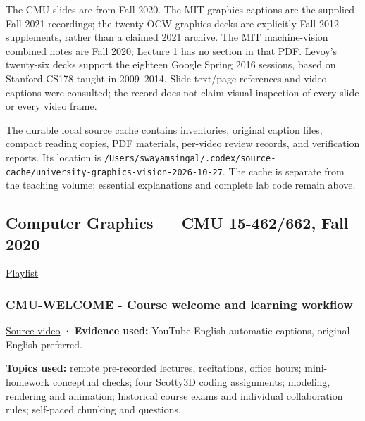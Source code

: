 The CMU slides are from Fall 2020. The MIT graphics captions are the supplied Fall 2021 recordings; the twenty OCW graphics decks are explicitly Fall 2012 supplements, rather than a claimed 2021 archive. The MIT machine-vision combined notes are Fall 2020; Lecture 1 has no section in that PDF. Levoy's twenty-six decks support the eighteen Google Spring 2016 sessions, based on Stanford CS178 taught in 2009--2014. Slide text/page references and video captions were consulted; the record does not claim visual inspection of every slide or every video frame.

The durable local source cache contains inventories, original caption files, compact reading copies, PDF materials, per-video review records, and verification reports. Its location is \texttt{/Users/swayamsingal/.codex/source-cache/university-graphics-vision-2026-10-27}. The cache is separate from the teaching volume; essential explanations and complete lab code remain above.

\subsection{Computer Graphics --- CMU 15-462/662, Fall 2020}\label{04-visual-computing-ii-ch036-computer-graphics-cmu-15-462662-fall-2020}

\hypertarget{04-visual-computing-ii-ch036-computer-graphics-cmu-15-462662-fall-2020}{}

\href{https://www.youtube.com/playlist?list=PL9_jI1bdZmz2emSh0UQ5iOdT2xRHFHL7E}{Playlist}

\subsubsection{CMU-WELCOME - Course welcome and learning workflow}\label{04-visual-computing-ii-ch036-cmu-welcome---course-welcome-and-learning-workflow}

\hypertarget{04-visual-computing-ii-ch036-cmu-welcome---course-welcome-and-learning-workflow}{}

\href{https://www.youtube.com/watch?v=W6yEALqsD7k}{Source video} · \textbf{Evidence used:} YouTube English automatic captions, original English preferred.

\textbf{Topics used:} remote pre-recorded lectures, recitations, office hours; mini-homework conceptual checks; four Scotty3D coding assignments; modeling, rendering and animation; historical course exams and individual collaboration rules; self-paced chunking and questions.

